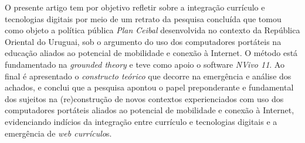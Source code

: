 \documentclass{../../common-shared/cls/Article_Class_RevInfor}
\begin{document}
%
\begin{resumo}
O presente artigo tem por objetivo refletir sobre a integração currículo e tecnologias digitais por meio de um retrato da pesquisa concluída que tomou como objeto a política pública \textit{Plan Ceibal} desenvolvida no contexto da República Oriental do Uruguai, sob o argumento do uso dos computadores portáteis na educação aliados ao potencial de mobilidade e conexão à Internet. O método está fundamentado na \textit{grounded theory} e teve como apoio o software \textit{NVivo 11}. Ao final é apresentado o \textit{constructo teórico} que decorre na emergência e análise dos achados, e conclui que a pesquisa apontou o papel preponderante e fundamental dos sujeitos na (re)construção de novos contextos experienciados com uso dos computadores portáteis aliados ao potencial de mobilidade e conexão à Internet, evidenciando indícios da integração entre currículo e tecnologias digitais e a emergência de \textit{web currículo}s.

\end{resumo}

\end{document}
